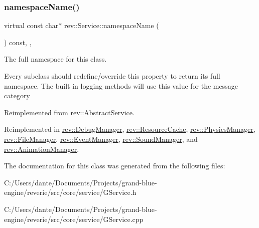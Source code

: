 \mbox{\label{classrev_1_1_service_a831f5bf8c53584ec830aaee38ea58e7b}} 
\subsubsection{\texorpdfstring{namespaceName()}{namespaceName()}}
{\footnotesize\ttfamily virtual const char$\ast$ rev\+::\+Service\+::namespace\+Name (\begin{DoxyParamCaption}{ }\end{DoxyParamCaption}) const\hspace{0.3cm}{\ttfamily [inline]}, {\ttfamily [override]}, {\ttfamily [virtual]}}



The full namespace for this class. 

Every subclass should redefine/override this property to return its full namespace. The built in logging methods will use this value for the message category 

Reimplemented from \mbox{\hyperlink{classrev_1_1_abstract_service_a062e932eaa2eab0109288f2b32e459f7}{rev\+::\+Abstract\+Service}}.



Reimplemented in \mbox{\hyperlink{classrev_1_1_debug_manager_a0f83cdbbd2ed91549fe2ae4fdf8809b6}{rev\+::\+Debug\+Manager}}, \mbox{\hyperlink{classrev_1_1_resource_cache_a4ed6a3f7ea5e8ea20287a5bce1fa05b9}{rev\+::\+Resource\+Cache}}, \mbox{\hyperlink{classrev_1_1_physics_manager_ac541c7e0460d572c5bff2e4136c779e1}{rev\+::\+Physics\+Manager}}, \mbox{\hyperlink{classrev_1_1_file_manager_a57e18b80b80bde22fb0917daae4662bc}{rev\+::\+File\+Manager}}, \mbox{\hyperlink{classrev_1_1_event_manager_a5188a25a9b785d841c39aefafd5f391e}{rev\+::\+Event\+Manager}}, \mbox{\hyperlink{classrev_1_1_sound_manager_a00de07c95c3a3993ec7c2008cc2c0db3}{rev\+::\+Sound\+Manager}}, and \mbox{\hyperlink{classrev_1_1_animation_manager_a7654304032196589413ddb5fec41981b}{rev\+::\+Animation\+Manager}}.



The documentation for this class was generated from the following files\+:\begin{DoxyCompactItemize}
\item 
C\+:/\+Users/dante/\+Documents/\+Projects/grand-\/blue-\/engine/reverie/src/core/service/G\+Service.\+h\item 
C\+:/\+Users/dante/\+Documents/\+Projects/grand-\/blue-\/engine/reverie/src/core/service/G\+Service.\+cpp\end{DoxyCompactItemize}
